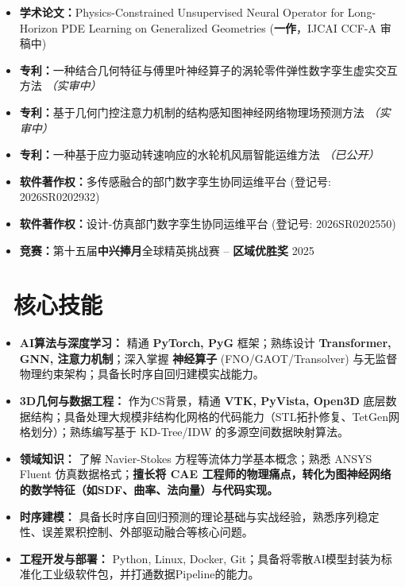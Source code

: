 \documentclass[11pt]{article}
\begin{document}
\begin{itemize}
    \item \textbf{学术论文：}Physics-Constrained Unsupervised Neural Operator for Long-Horizon PDE Learning on Generalized Geometries (\textbf{一作}，IJCAI CCF-A 审稿中)
    \item \textbf{专利：}一种结合几何特征与傅里叶神经算子的涡轮零件弹性数字孪生虚实交互方法 \textit{（实审中）}
    \item \textbf{专利：}基于几何门控注意力机制的结构感知图神经网络物理场预测方法 \textit{（实审中）}
    \item \textbf{专利：}一种基于应力驱动转速响应的水轮机风扇智能运维方法 \textit{（已公开）}
    \item \textbf{软件著作权：}多传感融合的部门数字孪生协同运维平台 (登记号: 2026SR0202932)
    \item \textbf{软件著作权：}设计-仿真部门数字孪生协同运维平台 (登记号: 2026SR0202550)
    \item \textbf{竞赛：}第十五届\textbf{中兴捧月}全球精英挑战赛 -- \textbf{区域优胜奖} \hfill 2025
\end{itemize}

  
\section{\makebox[\widthof{\faCogs}][c]{\color{CVBlue}\faCogs}\ 核心技能}
\begin{itemize}
    \item \textbf{AI算法与深度学习：} 精通 \textbf{PyTorch, PyG} 框架；熟练设计 \textbf{Transformer, GNN, 注意力机制}；深入掌握 \textbf{神经算子} (FNO/GAOT/Transolver) 与无监督物理约束架构；具备长时序自回归建模实战能力。
    \item \textbf{3D几何与数据工程：} 作为CS背景，精通 \textbf{VTK, PyVista, Open3D} 底层数据结构；具备处理大规模非结构化网格的代码能力（STL拓扑修复、TetGen网格划分）；熟练编写基于 KD-Tree/IDW 的多源空间数据映射算法。
    \item \textbf{领域知识：} 了解 Navier-Stokes 方程等流体力学基本概念；熟悉 ANSYS Fluent 仿真数据格式；\textbf{擅长将 CAE 工程师的物理痛点，转化为图神经网络的数学特征（如SDF、曲率、法向量）与代码实现。}
    \item \textbf{时序建模：} 具备长时序自回归预测的理论基础与实战经验，熟悉序列稳定性、误差累积控制、外部驱动融合等核心问题。
    \item \textbf{工程开发与部署：} Python, Linux, Docker, Git；具备将零散AI模型封装为标准化工业级软件包，并打通数据Pipeline的能力。
\end{itemize}
\end{document}
